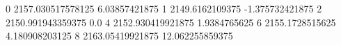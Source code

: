 0 2157.030517578125 6.03857421875
1 2149.6162109375 -1.375732421875
2 2150.991943359375 0.0
4 2152.930419921875 1.9384765625
6 2155.1728515625 4.180908203125
8 2163.05419921875 12.062255859375
